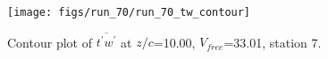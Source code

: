 \begin{figure}[H]
\centering
\texttt{[image: figs/run\_70/run\_70\_tw\_contour]}
\caption{Contour plot of $\overline{t^\prime w^\prime}$ at $z/c$=10.00, $V_{free}$=33.01, station 7.}
\label{fig:run_70_tw_contour}
\end{figure}


